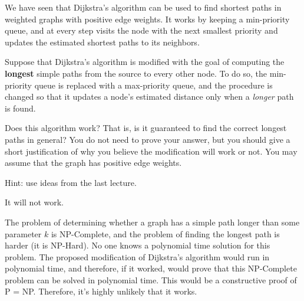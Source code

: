 \begin{prob}
    We have seen that Dijkstra's algorithm can be used to find shortest paths in
    weighted graphs with positive edge weights. It works by keeping a min-priority
    queue, and at every step visits the node with the next smallest priority and updates
    the estimated shortest paths to its neighbors.

    Suppose that Dijkstra's algorithm is modified with the goal of computing the \textbf{longest}
    simple paths from the source to every other node. To do so, the min-priority queue
    is replaced with a max-priority queue, and the  procedure is changed so
    that it updates a node's estimated distance only when a \emph{longer} path is found.

    Does this algorithm work? That is, is it guaranteed to find the correct
    longest paths in general? You do not need to prove your answer, but you
    should give a short justification of why you believe the modification will work
    or not. You may assume that the graph has positive edge weights.

    Hint: use ideas from the last lecture.

    \begin{soln}
        It will not work.

        The problem of determining whether a graph has a simple path longer than some
        parameter $k$ is NP-Complete, and the problem of finding the longest path
        is harder (it is NP-Hard). No one knows a polynomial time solution for this problem.
        The proposed modification of Dijkstra's algorithm would run in polynomial time,
        and therefore, if it worked, would prove that this NP-Complete problem can be solved 
        in polynomial time. This would be a constructive proof of P = NP. Therefore, it's
        highly unlikely that it works.

    \end{soln}
\end{prob}
